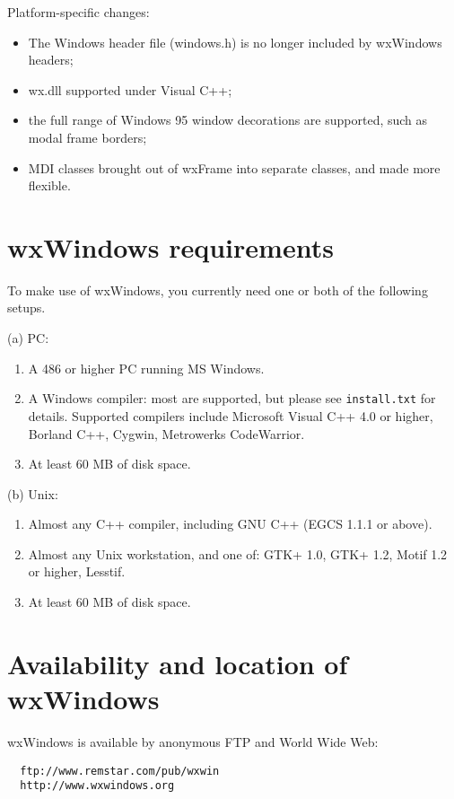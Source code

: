 Platform-specific changes:

\begin{itemize}\itemsep=0pt
\item The Windows header file (windows.h) is no longer included by wxWindows headers;
\item wx.dll supported under Visual C++;
\item the full range of Windows 95 window decorations are supported, such as modal frame
borders;
\item MDI classes brought out of wxFrame into separate classes, and made more flexible.
\end{itemize}

\section{wxWindows requirements}\label{requirements}

To make use of wxWindows, you currently need one or both of the
following setups.

(a) PC:

\begin{enumerate}\itemsep=0pt
\item A 486 or higher PC running MS Windows.
\item A Windows compiler: most are supported, but please see {\tt install.txt} for
details. Supported compilers include Microsoft Visual C++ 4.0 or higher, Borland C++, Cygwin,
Metrowerks CodeWarrior.
\item At least 60 MB of disk space.
\end{enumerate}

(b) Unix:

\begin{enumerate}\itemsep=0pt
\item Almost any C++ compiler, including GNU C++ (EGCS 1.1.1 or above).
\item Almost any Unix workstation, and one of: GTK+ 1.0, GTK+ 1.2, Motif 1.2 or higher, Lesstif.
\item At least 60 MB of disk space.
\end{enumerate}

\section{Availability and location of wxWindows}

wxWindows is available by anonymous FTP and World Wide Web:

\begin{verbatim}
  ftp://www.remstar.com/pub/wxwin
  http://www.wxwindows.org
\end{verbatim}

